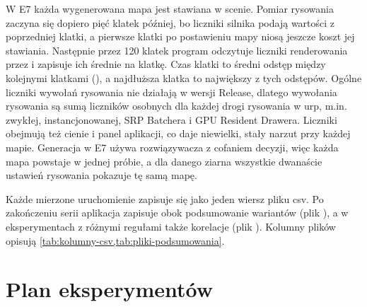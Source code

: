 W E7 każda wygenerowana mapa jest stawiana w scenie. Pomiar rysowania zaczyna się dopiero pięć klatek później, bo liczniki silnika podają wartości z poprzedniej klatki, a pierwsze klatki po postawieniu mapy niosą jeszcze koszt jej stawiania. Następnie przez 120 klatek program odczytuje liczniki renderowania przez  i zapisuje ich średnie na klatkę. Czas klatki to średni odstęp między kolejnymi klatkami (), a najdłuższa klatka to największy z tych odstępów. Ogólne liczniki wywołań rysowania nie działają w wersji Release, dlatego wywołania rysowania są sumą liczników osobnych dla każdej drogi rysowania w \ac{urp}, m.in. zwykłej, instancjonowanej, SRP Batchera i GPU Resident Drawera. Liczniki obejmują też cienie i panel aplikacji, co daje niewielki, stały narzut przy każdej mapie. Generacja w E7 używa rozwiązywacza  z cofaniem decyzji, więc każda mapa powstaje w jednej próbie, a dla danego ziarna wszystkie dwanaście ustawień rysowania pokazuje tę samą mapę.

Każde mierzone uruchomienie zapisuje się jako jeden wiersz pliku \ac{csv}. Po zakończeniu serii aplikacja zapisuje obok podsumowanie wariantów (plik ), a w eksperymentach z różnymi regułami także korelacje (plik ). Kolumny plików opisują \cref{tab:kolumny-csv,tab:pliki-podsumowania}.

\section{Plan eksperymentów}
\label{sec:plan}

